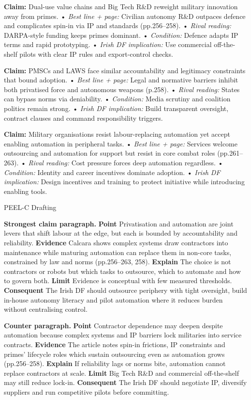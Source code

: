 \textbf{Claim:} Dual-use value chains and Big Tech R&D reweight military innovation away from primes.
• \emph{Best line + page:} Civilian autonomy R&D outpaces defence and complicates spin-in via IP and standards (pp.256–258).
• \emph{Rival reading:} DARPA-style funding keeps primes dominant.
• \emph{Condition:} Defence adapts IP terms and rapid prototyping.
• \emph{Irish DF implication:} Use commercial off-the-shelf pilots with clear IP rules and export-control checks.

\textbf{Claim:} PMSCs and LAWS face similar accountability and legitimacy constraints that bound adoption.
• \emph{Best line + page:} Legal and normative barriers inhibit both privatised force and autonomous weapons (p.258).
• \emph{Rival reading:} States can bypass norms via deniability.
• \emph{Condition:} Media scrutiny and coalition politics remain strong.
• \emph{Irish DF implication:} Build transparent oversight, contract clauses and command responsibility triggers.

\textbf{Claim:} Military organisations resist labour-replacing automation yet accept enabling automation in peripheral tasks.
• \emph{Best line + page:} Services welcome outsourcing and automation for support but resist in core combat roles (pp.261–263).
• \emph{Rival reading:} Cost pressure forces deep automation regardless.
• \emph{Condition:} Identity and career incentives dominate adoption.
• \emph{Irish DF implication:} Design incentives and training to protect initiative while introducing enabling tools.

PEEL-C Drafting

\textbf{Strongest claim paragraph.}
\textbf{Point} Privatisation and automation are joint levers that shift labour at the edge, but each is bounded by accountability and reliability.
\textbf{Evidence} Calcara shows complex systems draw contractors into maintenance while maturing automation can replace them in non-core tasks, constrained by law and norms (pp.256–263, 258).
\textbf{Explain} The choice is not contractors or robots but which tasks to outsource, which to automate and how to govern both.
\textbf{Limit} Evidence is conceptual with few measured thresholds. \textbf{Consequent} The Irish DF should outsource periphery with tight oversight, build in-house autonomy literacy and pilot automation where it reduces burden without centralising control.

\textbf{Counter paragraph.}
\textbf{Point} Contractor dependence may deepen despite automation because complex systems and IP barriers lock militaries into service contracts.
\textbf{Evidence} The article notes spin-in frictions, IP constraints and primes’ lifecycle roles which sustain outsourcing even as automation grows (pp.256–258).
\textbf{Explain} If reliability lags or norms bite, automation cannot replace contractors at scale.
\textbf{Limit} Big Tech R&D and commercial off-the-shelf may still reduce lock-in. \textbf{Consequent} The Irish DF should negotiate IP, diversify suppliers and run competitive pilots before committing.

